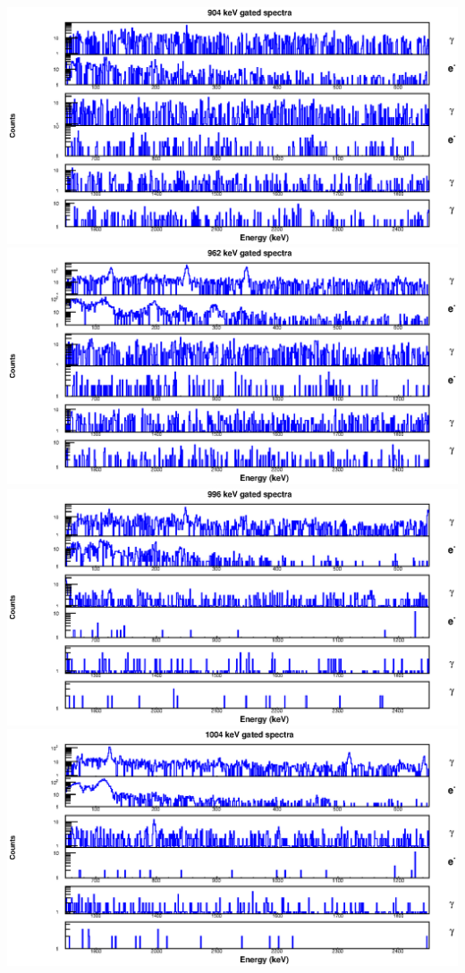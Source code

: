 \begin{landscape}
\includegraphics[scale=1.2]{154Gd_Appendix/904_combined.eps}
\includegraphics[scale=1.2]{154Gd_Appendix/962_combined.eps}
\includegraphics[scale=1.2]{154Gd_Appendix/996_combined.eps}
\includegraphics[scale=1.2]{154Gd_Appendix/1004_combined.eps}

\end{landscape}
